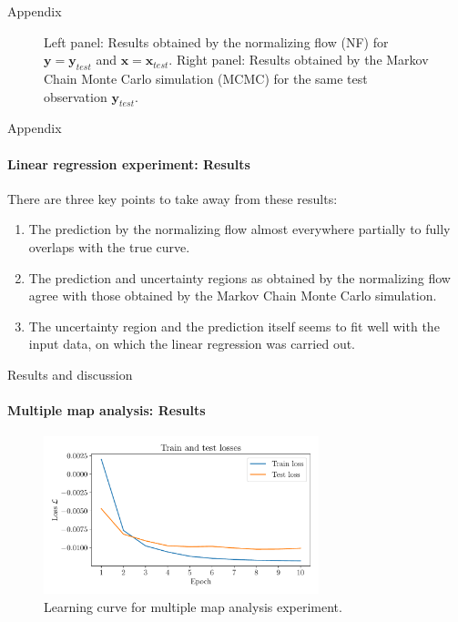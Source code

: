\documentclass{beamer}
\newcommand\vect[1]{\ensuremath{\bm{#1}}}
\begin{document}
\begin{frame}[allowframebreaks]{Appendix}
\begin{figure}[h!]
\begin{subfigure}[t]{0.49\textwidth}
		\end{subfigure}
		\caption{Left panel: Results obtained by the normalizing flow (NF) for $\vect{y} = \vect{y}_{test}$ and $\vect{x} = \vect{x}_{test}$. Right panel: Results obtained by the Markov Chain Monte Carlo simulation (MCMC) for the same test observation $\vect{y}_{test}$.}
		\label{fig:nf-linear-regression-example-performance}
	\end{figure}
\end{frame}

\begin{frame}[allowframebreaks]{Appendix}
	\framesubtitle{Linear regression experiment: Results}
	There are three key points to take away from these results:
	\begin{enumerate}
		\item The prediction by the normalizing flow almost everywhere partially to fully overlaps with the true curve.
		\item The prediction and uncertainty regions as obtained by the normalizing flow agree with those obtained by the Markov Chain Monte Carlo simulation.
		\item The uncertainty region and the prediction itself seems to fit well with the input data, on which the linear regression was carried out.
	\end{enumerate}
\end{frame}

\begin{frame}[allowframebreaks]{Results and discussion}
	\framesubtitle{Multiple map analysis: Results} %
\begin{figure}[h!]
	\centering
	\includegraphics[width=8cm]{figures/thesis/nf-milne-eddington-example-2-loss-nflows-piecewisequadratic.pdf}
	\caption{Learning curve for multiple map analysis experiment.}
	\label{fig:nf-milne-eddington-example-2-loss-nflows-piecewisequadratic}
\end{figure}
\end{frame}
\end{document}
